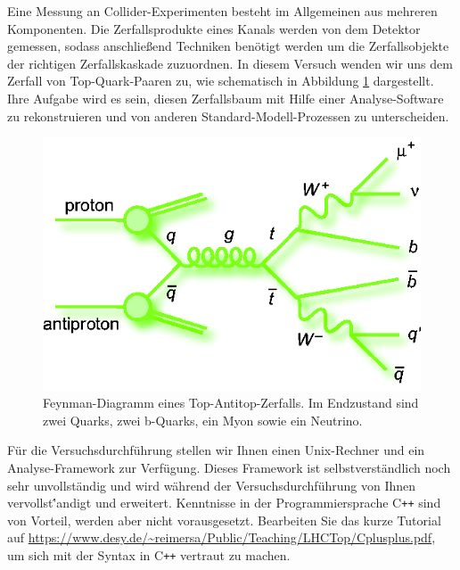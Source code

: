 	Eine Messung an Collider-Experimenten besteht im Allgemeinen aus mehreren Komponenten. Die Zerfallsprodukte eines Kanals werden von dem Detektor gemessen, sodass anschlie\ss{}end Techniken ben\"otigt werden um die Zerfallsobjekte der richtigen Zerfallskaskade zuzuordnen. In diesem Versuch wenden wir uns dem Zerfall von Top-Quark-Paaren zu, wie schematisch in Abbildung \ref{ttbarsemilep} dargestellt. Ihre Aufgabe wird es sein, diesen Zerfallsbaum mit Hilfe einer Analyse-Software zu rekonstruieren und von anderen Standard-Modell-Prozessen zu unterscheiden.
\begin{figure}[h]
\centerline{\includegraphics[scale=0.5]{pics_feynman_ttbar_mujets}}
\caption{Feynman-Diagramm eines Top-Antitop-Zerfalls. Im Endzustand sind zwei Quarks, zwei b-Quarks, ein Myon sowie ein Neutrino.}
\label{ttbarsemilep}
\end{figure}

F\"ur die Versuchsdurchf\"uhrung stellen wir Ihnen einen Unix-Rechner und ein Analyse-Framework zur Verf\"ugung. Dieses Framework ist selbstverst\"andlich noch sehr
 unvollst\"andig und wird w\"ahrend der Versuchsdurchf\"uhrung von Ihnen vervollst\''andigt und erweitert. Kenntnisse in der Programmiersprache C\texttt{++} sind von Vorteil, 
werden aber nicht vorausgesetzt. Bearbeiten Sie das kurze Tutorial auf
\url{https://www.desy.de/~reimersa/Public/Teaching/LHCTop/Cplusplus.pdf}, um sich mit der Syntax in C\texttt{++} vertraut zu machen.\\

